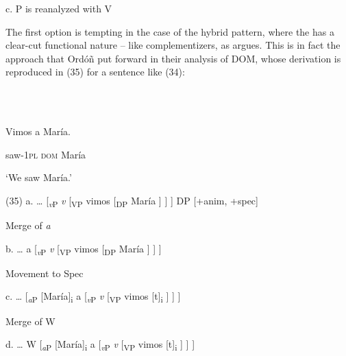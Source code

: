 \documentclass[output=paper]{langsci/langscibook}
\begin{document}
\begin{styleHTMLPreformatted}
  c.   P is reanalyzed with V
\end{styleHTMLPreformatted}

\begin{styleHTMLPreformatted}
The first option is tempting in the case of the hybrid pattern, where the  has a clear-cut functional nature – like complementizers, as \citet{Kayne2004} argues. This is in fact the approach that Ordóñ\citet{ez2017} put forward in their analysis of DOM, whose derivation is reproduced in (35) for a sentence like (34):
\end{styleHTMLPreformatted}

\begin{styleHTMLPreformatted}
\ea%
    \label{ex:key:34}
    \gll\\
        \\
    \glt
    \z

\end{styleHTMLPreformatted}

\begin{styleHTMLPreformatted}
  Vimos     a          María.            
\end{styleHTMLPreformatted}

\begin{styleHTMLPreformatted}
  saw{}-\textsc{1pl  dom}   María
\end{styleHTMLPreformatted}

\begin{styleHTMLPreformatted}
  ‘We saw María.’
\end{styleHTMLPreformatted}

 (35)  a.  …  [\textit{\textsubscript{v}}\textsubscript{P}  \textit{v}  [\textsubscript{VP} vimos   [\textsubscript{DP} María ] ] ]    DP [+anim, +spec]

  Merge of \textit{a}

b.  …  a  [\textit{\textsubscript{v}}\textsubscript{P}  \textit{v}  [\textsubscript{VP} vimos   [\textsubscript{DP} María ] ] ]

  Movement to Spec 

c.  …  [\textit{\textsubscript{a}}\textsubscript{P} [María]\textsubscript{i}  a  [\textit{\textsubscript{v}}\textsubscript{P}  \textit{v}  [\textsubscript{VP} vimos [t]\textsubscript{i} ] ] ]  

  Merge of W 

d.  …  W [\textit{\textsubscript{a}}\textsubscript{P} [María]\textsubscript{i}  a  [\textit{\textsubscript{v}}\textsubscript{P}  \textit{v}  [\textsubscript{VP} vimos [t]\textsubscript{i} ] ] ]  
\end{document}
